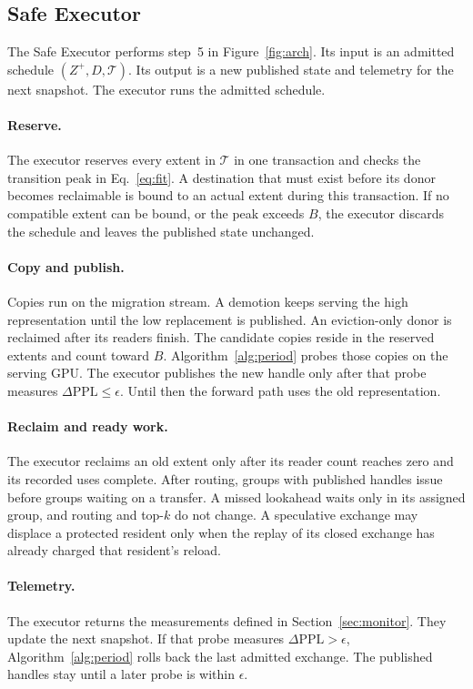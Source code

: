 \subsection{Safe Executor}
\label{sec:admit}

The Safe Executor performs step~5 in Figure~\ref{fig:arch}.
Its input is an admitted schedule \((Z^+,D,\mathcal T)\).
Its output is a new published state and telemetry for the next snapshot.
The executor runs the admitted schedule.

\paragraph{Reserve.}
The executor reserves every extent in \(\mathcal T\) in one transaction and checks the transition peak in Eq.~\eqref{eq:fit}.
A destination that must exist before its donor becomes reclaimable is bound to an actual extent during this transaction.
If no compatible extent can be bound, or the peak exceeds \(B\), the executor discards the schedule and leaves the published state unchanged.

\paragraph{Copy and publish.}
\label{sec:publish}
Copies run on the migration stream.
A demotion keeps serving the high representation until the low replacement is published.
An eviction-only donor is reclaimed after its readers finish.
The candidate copies reside in the reserved extents and count toward \(B\). Algorithm~\ref{alg:period} probes those copies on the serving GPU. The executor publishes the new handle only after that probe measures \(\Delta\mathrm{PPL}\le\epsilon\). Until then the forward path uses the old representation.

\paragraph{Reclaim and ready work.}
The executor reclaims an old extent only after its reader count reaches zero and its recorded uses complete.
After routing, groups with published handles issue before groups waiting on a transfer.
A missed lookahead waits only in its assigned group, and routing and top-\(k\) do not change.
A speculative exchange may displace a protected resident only when the replay of its closed exchange has already charged that resident's reload.

\paragraph{Telemetry.}
The executor returns the measurements defined in Section~\ref{sec:monitor}.
They update the next snapshot. If that probe measures \(\Delta\mathrm{PPL}>\epsilon\), Algorithm~\ref{alg:period} rolls back the last admitted exchange. The published handles stay until a later probe is within \(\epsilon\).
